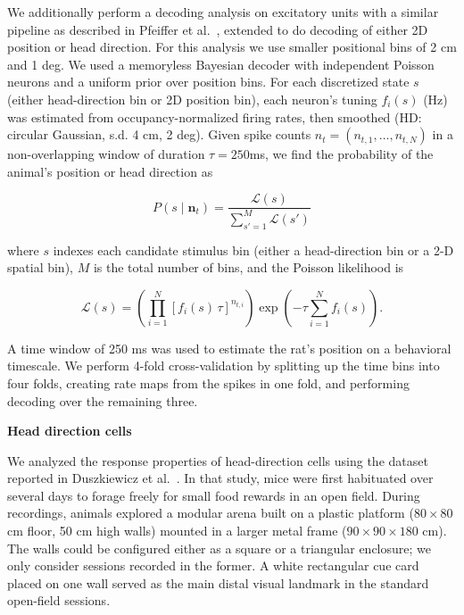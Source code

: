 \documentclass[11pt]{article}
\begin{document}
We additionally perform a decoding analysis on excitatory units with a similar pipeline as described in Pfeiffer et al.~\cite{Pfeiffer2013}, extended to do decoding of either 2D position or head direction. For this analysis we use smaller positional bins of 2 cm and 1 deg. We used a memoryless Bayesian decoder with independent Poisson neurons and a uniform prior over position bins. For each discretized state $s$ (either head-direction bin or 2D position bin), each neuron’s tuning $f_i(s)$ (Hz) was estimated from occupancy-normalized firing rates, then smoothed (HD: circular Gaussian, s.d. 4 cm, 2 deg). Given spike counts $n_t = (n_{t,1}, \dots, n_{t, N})$ in a non-overlapping window of duration $\tau=250$ms, we find the probability of the animal's position or head direction as 

\begin{equation}
P(s \mid \mathbf{n}_t) = \frac{\mathcal{L}(s)}{\sum_{s'=1}^{M} \mathcal{L}(s')}
\label{eq:posterior}
\end{equation}

where $s$ indexes each candidate stimulus bin (either a head-direction bin or a 2-D spatial bin), $M$ is the total number of bins, and the Poisson likelihood is

\begin{equation}
\mathcal{L}(s) = \left(\prod_{i=1}^{N} \left[f_i(s)\,\tau\right]^{n_{t,i}}\right) \exp\!\left(-\tau \sum_{i=1}^{N} f_i(s)\right).
\label{eq:likelihood}
\end{equation}

A time window of 250 ms was used to estimate the rat's position on a behavioral timescale. We perform 4-fold cross-validation by splitting up the time bins into four folds, creating rate maps from the spikes in one fold, and performing decoding over the remaining three. 

{\bf Head direction cells}

We analyzed the response properties of head-direction cells using the dataset reported in Duszkiewicz et al.~\cite{Duszkiewicz2024}. In that study, mice were first habituated over several days to forage freely for small food rewards in an open field. During recordings, animals explored a modular arena built on a plastic platform ($80 \times 80$ cm floor, 50 cm high walls) mounted in a larger metal frame ($90 \times 90 \times 180$ cm). The walls could be configured either as a square or a triangular enclosure; we only consider sessions recorded in the former. A white rectangular cue card placed on one wall served as the main distal visual landmark in the standard open-field sessions.
\end{document}
